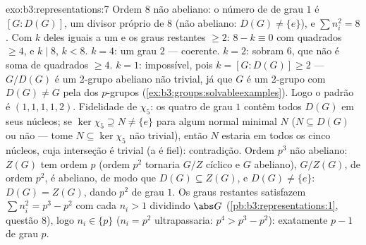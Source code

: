 \begin{solution}{exo:b3:representations:7}
Ordem $8$ não abeliano: o número de  de grau $1$ é
$[G : D(G)]$, um divisor próprio de $8$ (não abeliano: $D(G) \neq
\{e\}$), e $\sum n_i^2 = 8$. Com $k$ deles iguais a um e os
graus restantes $\geq 2$: $8 - k \equiv 0$ com quadrados $\geq 4$, e $k
\mid 8$, $k < 8$. $k = 4$: um grau $2$ --- coerente. $k =
2$: sobram $6$, que não é soma de quadrados $\geq 4$. $k = 1$:
impossível, pois $k = [G : D(G)] \geq 2$ --- $G/D(G)$ é um
$2$-grupo abeliano não trivial, já que $G$ é um $2$-grupo com
$D(G) \neq G$ pela  dos $p$-grupos
(\cref{ex:b3:groups:solvableexamples}). Logo o padrão é
$(1,1,1,1,2)$. Fidelidade de $\chi_5$: os quatro  de grau $1$
contêm todos $D(G)$ em seus núcleos; se $\ker\chi_5
\supseteq N \neq \{e\}$ para algum normal minimal $N$ ($N
\subseteq D(G)$ ou não --- tome $N \subseteq \ker\chi_5$
não trivial), então $N$ estaria em todos os cinco núcleos, cuja
interseção é trivial (a  é
fiel): contradição. Ordem $p^3$ não abeliano: $Z(G)$ tem
ordem $p$ (ordem $p^2$ tornaria $G/Z$ cíclico e $G$ abeliano),
$G/Z(G)$, de ordem $p^2$, é abeliano, de modo que $D(G) \subseteq Z(G)$,
e $D(G) \ne \{e\}$: $D(G) = Z(G)$, dando $p^2$  de
grau $1$. Os graus restantes satisfazem $\sum n_i^2 = p^3 -
p^2$ com cada $n_i > 1$ dividindo $\abs G$
(\cref{pb:b3:representations:1}, questão 8), logo $n_i \in
\{p\}$ ($n_i = p^2$ ultrapassaria: $p^4 > p^3 - p^2$): exatamente $p
- 1$  de grau $p$.
\end{solution}

